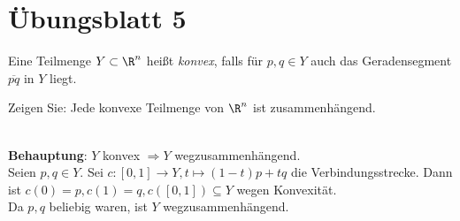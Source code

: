 % 
\newpage
\setcounter{problemcounter}{0}
\section{Übungsblatt 5}

\begin{assignment}
  Eine Teilmenge \( Y \subset \R^n \) heißt \emph{konvex}, falls für \( p,q \in Y \)  auch das Geradensegment \( \overline{pq} \) in \( Y \) liegt.

  Zeigen Sie: Jede konvexe Teilmenge von \( \R^n \) ist zusammenhängend.
\end{assignment}
\begin{solution}
  \  \\
  \textbf{Behauptung}: \( Y \) konvex \( \Rightarrow Y \) wegzusammenhängend. \\
  Seien \( p, q \in Y \). Sei \( c: [0,1] \to Y, t \mapsto (1-t)p +tq \) die Verbindungsstrecke.
  Dann ist \( c(0) = p, c(1) = q, c([0,1]) \subseteq Y \) wegen Konvexität. \\
  Da \( p,q \) beliebig waren, ist \( Y \) wegzusammenhängend. 
\end{solution}

